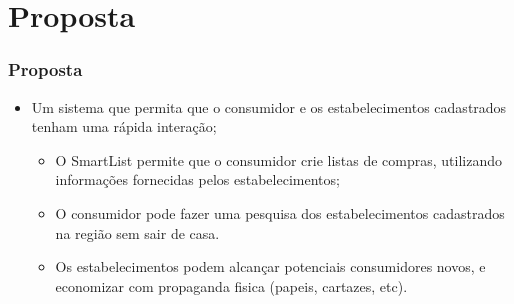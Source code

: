\section{Proposta}

\begin{frame}
\frametitle{Proposta}
	\begin{itemize}
		\item Um sistema que permita que o consumidor e os estabelecimentos cadastrados tenham uma rápida interação;
		\begin{itemize}
			\item O SmartList permite que o consumidor crie listas de compras, utilizando informações fornecidas pelos estabelecimentos;
			\item O consumidor pode fazer uma pesquisa dos estabelecimentos cadastrados na região sem sair de casa.
			\item Os estabelecimentos podem alcançar potenciais consumidores novos, e economizar com propaganda fisica (papeis, cartazes, etc).
		\end{itemize}
	\end{itemize}
\end{frame}